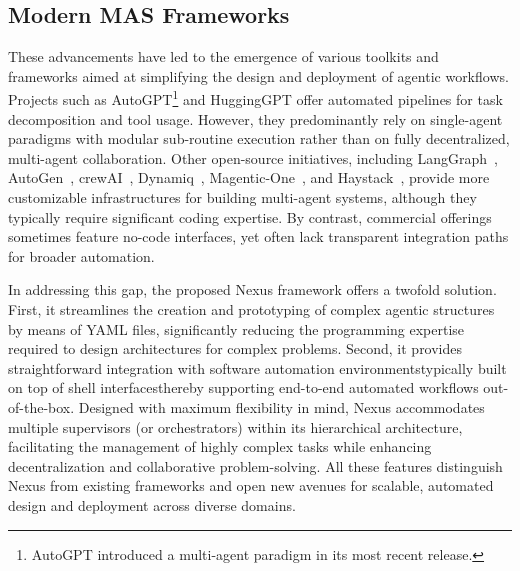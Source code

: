\subsection{Modern MAS Frameworks}
These advancements have led to the emergence of various toolkits and frameworks aimed at simplifying the design and deployment of agentic workflows. Projects such as AutoGPT\footnote{AutoGPT introduced a multi-agent paradigm in its most recent release.}\cite{autogpt} and HuggingGPT\cite{shen2024hugginggpt} offer automated pipelines for task decomposition and tool usage. However, they predominantly rely on single-agent paradigms with modular sub-routine execution rather than on fully decentralized, multi-agent collaboration. Other open-source initiatives, including LangGraph~\cite{langgraph}, AutoGen~\cite{wu2023autogen}, crewAI~\cite{crewai}, Dynamiq~\cite{dynamiq}, Magentic-One~\cite{fourney2024magentic}, and Haystack~\cite{haystack}, provide more customizable infrastructures for building multi-agent systems, although they typically require significant coding expertise. By contrast, commercial offerings sometimes feature no-code interfaces, yet often lack transparent integration paths for broader automation.

In addressing this gap, the proposed Nexus framework offers a twofold solution. First, it streamlines the creation and prototyping of complex agentic structures by means of YAML files, significantly reducing the programming expertise required to design architectures for complex problems. Second, it provides straightforward integration with software automation environments\textemdash typically built on top of shell interfaces\textemdash thereby supporting end-to-end automated workflows out-of-the-box. Designed with maximum flexibility in mind, Nexus accommodates multiple supervisors (or orchestrators) within its hierarchical architecture, facilitating the management of highly complex tasks while enhancing decentralization and collaborative problem-solving. All these features distinguish Nexus from existing frameworks and open new avenues for scalable, automated design and deployment across diverse domains.